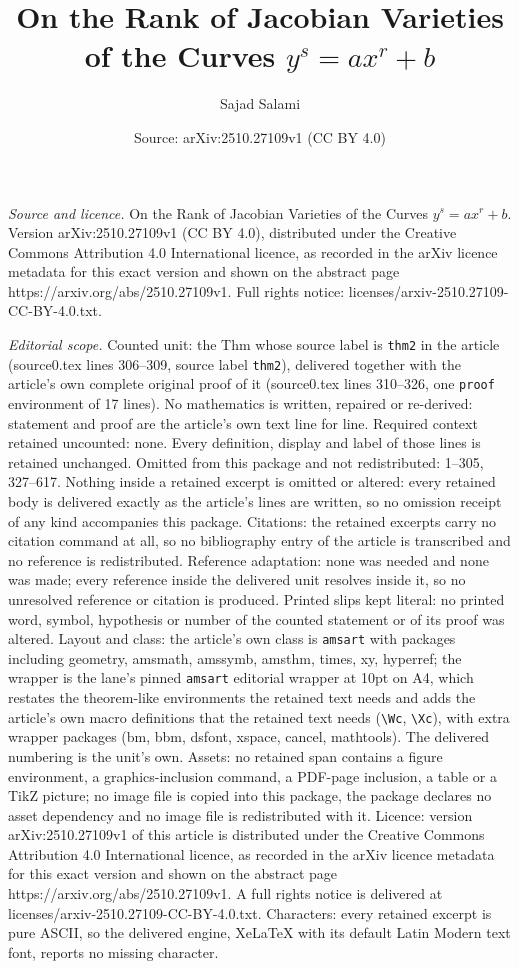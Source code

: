 \documentclass[10pt,a4paper]{amsart}
\title[On the Rank of Jacobian Varieties of the Curves $y^s=ax^r+b$]{On the Rank of Jacobian Varieties of the Curves $y^s=ax^r+b$}
\author{Sajad Salami}
\date{Source: arXiv:2510.27109v1 (CC BY 4.0)}
\begin{document}
\maketitle

\noindent\emph{Source and licence.} On the Rank of Jacobian Varieties of the Curves $y^s=ax^r+b$. Version arXiv:2510.27109v1 (CC BY 4.0), distributed under the Creative Commons Attribution 4.0 International licence, as recorded in the arXiv licence metadata for this exact version and shown on the abstract page https://arxiv.org/abs/2510.27109v1. Full rights notice: licenses/arxiv-2510.27109-CC-BY-4.0.txt.\par\smallskip

\noindent\textit{Editorial scope.} Counted unit: the Thm whose source label is \texttt{thm2} in the article (source0.tex lines 306--309, source label \texttt{thm2}), delivered together with the article's own complete original proof of it (source0.tex lines 310--326, one \texttt{proof} environment of 17 lines). No mathematics is written, repaired or re-derived: statement and proof are the article's own text line for line. Required context retained uncounted: none. Every definition, display and label of those lines is retained unchanged. Omitted from this package and not redistributed: 1--305, 327--617. Nothing inside a retained excerpt is omitted or altered: every retained body is delivered exactly as the article's lines are written, so no omission receipt of any kind accompanies this package. Citations: the retained excerpts carry no citation command at all, so no bibliography entry of the article is transcribed and no reference is redistributed. Reference adaptation: none was needed and none was made; every reference inside the delivered unit resolves inside it, so no unresolved reference or citation is produced. Printed slips kept literal: no printed word, symbol, hypothesis or number of the counted statement or of its proof was altered. Layout and class: the article's own class is \texttt{amsart} with packages including geometry, amsmath, amssymb, amsthm, times, xy, hyperref; the wrapper is the lane's pinned \texttt{amsart} editorial wrapper at 10pt on A4, which restates the theorem-like environments the retained text needs and adds the article's own macro definitions that the retained text needs (\texttt{\textbackslash Wc}, \texttt{\textbackslash Xc}), with extra wrapper packages (bm, bbm, dsfont, xspace, cancel, mathtools). The delivered numbering is the unit's own. Assets: no retained span contains a figure environment, a graphics-inclusion command, a PDF-page inclusion, a table or a TikZ picture; no image file is copied into this package, the package declares no asset dependency and no image file is redistributed with it. Licence: version arXiv:2510.27109v1 of this article is distributed under the Creative Commons Attribution 4.0 International licence, as recorded in the arXiv licence metadata for this exact version and shown on the abstract page https://arxiv.org/abs/2510.27109v1. A full rights notice is delivered at licenses/arxiv-2510.27109-CC-BY-4.0.txt. Characters: every retained excerpt is pure ASCII, so the delivered engine, XeLaTeX with its default Latin Modern text font, reports no missing character.
\end{document}
